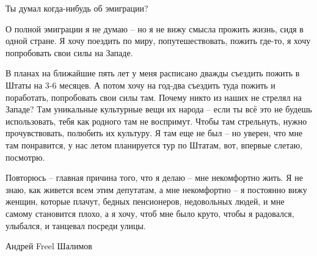 Ты думал когда-нибудь об эмиграции?

О полной эмиграции я не думаю – но я не вижу смысла прожить жизнь, сидя в одной
стране. Я хочу поездить по миру, попутешествовать, пожить где-то, я хочу
попробовать свои силы на Западе.

В планах на ближайшие пять лет у меня расписано дважды съездить пожить в Штаты
на 3-6 месяцев. А потом хочу на год-два съездить туда пожить и поработать,
попробовать свои силы там. Почему никто из наших не стрелял на Западе? Там
уникальные культурные вещи их народа – если ты всё это не будешь использовать,
тебя как родного там не воспримут. Чтобы там стрельнуть, нужно прочувствовать,
полюбить их культуру. Я там еще не был – но уверен, что мне там понравится, у
нас летом планируется тур по Штатам, вот, впервые слетаю, посмотрю.

Повторюсь – главная причина того, что я делаю – мне некомфортно жить.  Я не
знаю, как живется всем этим депутатам, а мне некомфортно – я постоянно вижу
женщин, которые плачут, бедных пенсионеров, недовольных людей, и мне самому
становится плохо, а я хочу, чтоб мне было круто, чтобы я радовался, улыбался, и
танцевал посреди улицы. 

Андрей Freel Шалимов
